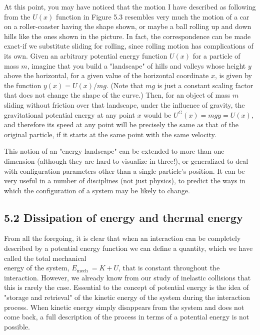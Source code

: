 \documentclass[10pt]{article}
\begin{document}
At this point, you may have noticed that the motion I have described as following from the $U(x)$ function in Figure 5.3 resembles very much the motion of a car on a roller-coaster having the shape shown, or maybe a ball rolling up and down hills like the ones shown in the picture. In fact, the correspondence can be made exact-if we substitute sliding for rolling, since rolling motion has complications of its own. Given an arbitrary potential energy function $U(x)$ for a particle of mass $m$, imagine that you build a "landscape" of hills and valleys whose height $y$ above the horizontal, for a given value of the horizontal coordinate $x$, is given by the function $y(x)=U(x) / m g$. (Note that $m g$ is just a constant scaling factor that does not change the shape of the curve.) Then, for an object of mass $m$ sliding without friction over that landscape, under the influence of gravity, the gravitational potential energy at any point $x$ would be $U^{G}(x)=m g y=U(x)$, and therefore its speed at any point will be precisely the same as that of the original particle, if it starts at the same point with the same velocity.

This notion of an "energy landscape" can be extended to more than one dimension (although they are hard to visualize in three!), or generalized to deal with configuration parameters other than a single particle's position. It can be very useful in a number of disciplines (not just physics), to predict the ways in which the configuration of a system may be likely to change.

\subsection*{5.2 Dissipation of energy and thermal energy}
From all the foregoing, it is clear that when an interaction can be completely described by a potential energy function we can define a quantity, which we have called the total mechanical\\
energy of the system, $E_{\text {mech }}=K+U$, that is constant throughout the interaction. However, we already know from our study of inelastic collisions that this is rarely the case. Essential to the concept of potential energy is the idea of "storage and retrieval" of the kinetic energy of the system during the interaction process. When kinetic energy simply disappears from the system and does not come back, a full description of the process in terms of a potential energy is not possible.
\end{document}
